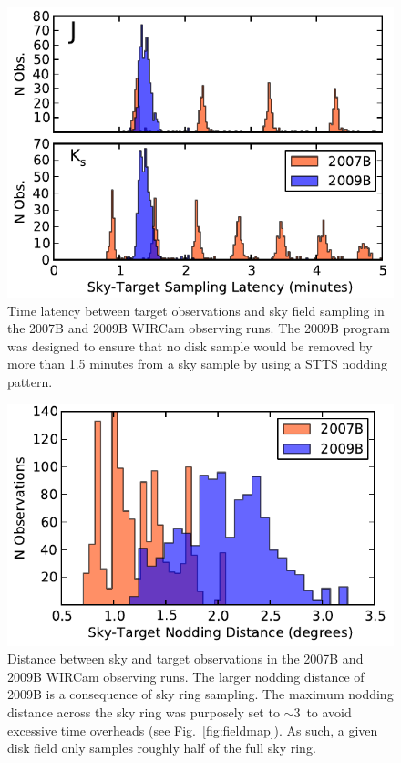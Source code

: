 \documentclass[iop]{emulateapj}
\newcommand{\Fig}[1]{Fig.~\ref{fig:#1}}  %
\begin{document}
\begin{figure}[t]
\centering
\includegraphics[width=\columnwidth]{figs/sky_target_lag}
\caption{Time latency between target observations and sky field sampling in the 2007B and 2009B WIRCam observing runs.
The 2009B program was designed to ensure that no disk sample would be removed by more than 1.5 minutes from a sky sample by using a STTS nodding pattern.}
\label{fig:sky_target_lag}
\end{figure}

\begin{figure}[t]
\centering
\includegraphics[width=\columnwidth]{figs/sky_target_dist}
\caption{Distance between sky and target observations in the 2007B and 2009B WIRCam observing runs.
The larger nodding distance of 2009B is a consequence of sky ring sampling.
The maximum nodding distance across the sky ring was purposely set to $\sim 3$\arcdeg\ to avoid excessive time overheads (see \Fig{fieldmap}).
As such, a given disk field only samples roughly half of the full sky ring.}
\label{fig:sky_target_dist}
\end{figure}
\end{document}
